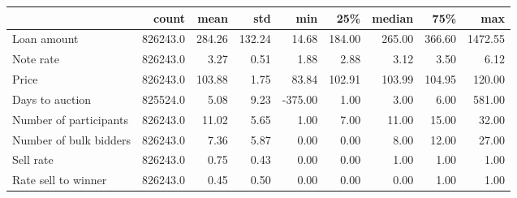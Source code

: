 \begin{tabular}{lrrrrrrrr}
\toprule
{} &     count &    mean &     std &     min &     25\% &  median &     75\% &      max \\
\midrule
Loan amount            &  826243.0 &  284.26 &  132.24 &   14.68 &  184.00 &  265.00 &  366.60 &  1472.55 \\
Note rate              &  826243.0 &    3.27 &    0.51 &    1.88 &    2.88 &    3.12 &    3.50 &     6.12 \\
Price                  &  826243.0 &  103.88 &    1.75 &   83.84 &  102.91 &  103.99 &  104.95 &   120.00 \\
Days to auction        &  825524.0 &    5.08 &    9.23 & -375.00 &    1.00 &    3.00 &    6.00 &   581.00 \\
Number of participants &  826243.0 &   11.02 &    5.65 &    1.00 &    7.00 &   11.00 &   15.00 &    32.00 \\
Number of bulk bidders &  826243.0 &    7.36 &    5.87 &    0.00 &    0.00 &    8.00 &   12.00 &    27.00 \\
Sell rate              &  826243.0 &    0.75 &    0.43 &    0.00 &    0.00 &    1.00 &    1.00 &     1.00 \\
Rate sell to winner    &  826243.0 &    0.45 &    0.50 &    0.00 &    0.00 &    0.00 &    1.00 &     1.00 \\
\bottomrule
\end{tabular}
